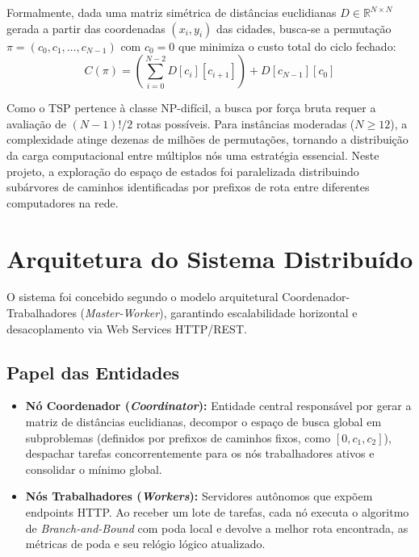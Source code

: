 \documentclass[12pt]{article}
\begin{document}
Formalmente, dada uma matriz simétrica de distâncias euclidianas $D \in \mathbb{R}^{N \times N}$ gerada a partir das coordenadas $(x_i, y_i)$ das cidades, busca-se a permutação $\pi = (c_0, c_1, \dots, c_{N-1})$ com $c_0 = 0$ que minimiza o custo total do ciclo fechado:
\begin{equation}
C(\pi) = \left( \sum_{i=0}^{N-2} D[c_i][c_{i+1}] \right) + D[c_{N-1}][c_0]
\end{equation}

Como o TSP pertence à classe NP-difícil, a busca por força bruta requer a avaliação de $(N-1)! / 2$ rotas possíveis. Para instâncias moderadas ($N \ge 12$), a complexidade atinge dezenas de milhões de permutações, tornando a distribuição da carga computacional entre múltiplos nós uma estratégia essencial. Neste projeto, a exploração do espaço de estados foi paralelizada distribuindo subárvores de caminhos identificadas por prefixos de rota entre diferentes computadores na rede.

\section{Arquitetura do Sistema Distribuído}
O sistema foi concebido segundo o modelo arquitetural Coordenador-Trabalhadores (\textit{Master-Worker}), garantindo escalabilidade horizontal e desacoplamento via Web Services HTTP/REST.

\subsection{Papel das Entidades}
\begin{itemize}
    \item \textbf{Nó Coordenador (\textit{Coordinator}):} Entidade central responsável por gerar a matriz de distâncias euclidianas, decompor o espaço de busca global em subproblemas (definidos por prefixos de caminhos fixos, como $[0, c_1, c_2]$), despachar tarefas concorrentemente para os nós trabalhadores ativos e consolidar o mínimo global.
    \item \textbf{Nós Trabalhadores (\textit{Workers}):} Servidores autônomos que expõem endpoints HTTP. Ao receber um lote de tarefas, cada nó executa o algoritmo de \textit{Branch-and-Bound} com poda local e devolve a melhor rota encontrada, as métricas de poda e seu relógio lógico atualizado.
\end{itemize}
\end{document}
